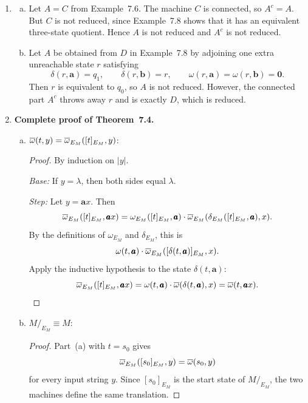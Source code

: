 \begin{enumerate}[{7.}1.]
\begin{enumerate}[(a)]
  \item The missing property is surjectivity of $\mu$ onto $S_2$.
\end{enumerate}

\item \begin{enumerate}[(a)]
  \item Let $A=C$ from Example~7.6.  The machine $C$ is connected, so $A^c=A$.
  But $C$ is not reduced, since Example~7.8 shows that it has an equivalent
  three-state quotient.  Hence $A$ is not reduced and $A^c$ is not reduced.

  \item Let $A$ be obtained from $D$ in Example~7.8 by adjoining one extra
  unreachable state $r$ satisfying
  \[
    \delta(r,\pmb{a})=q_1,\qquad \delta(r,\pmb{b})=r,\qquad
    \omega(r,\pmb{a})=\omega(r,\pmb{b})=\pmb{0}.
  \]
  Then $r$ is equivalent to $q_0$, so $A$ is not reduced.  However, the
  connected part $A^c$ throws away $r$ and is exactly $D$, which is reduced.
\end{enumerate}

\item \textbf{Complete proof of Theorem~7.4.}

\begin{enumerate}[(a)]
  \item $\overline{\omega}(t,y)=\overline{\omega}_{E_M}([t]_{E_M},y)$:

  \begin{proof}
  By induction on $|y|$.

  \emph{Base:} If $y=\lambda$, then both sides equal $\lambda$.

  \emph{Step:} Let $y=\pmb{a}x$.  Then
  \[
    \overline{\omega}_{E_M}([t]_{E_M},\pmb{a}x)
    =\omega_{E_M}([t]_{E_M},\pmb{a})\cdot
      \overline{\omega}_{E_M}(\delta_{E_M}([t]_{E_M},\pmb{a}),x).
  \]
  By the definitions of $\omega_{E_M}$ and $\delta_{E_M}$, this is
  \[
    \omega(t,\pmb{a})\cdot
      \overline{\omega}_{E_M}([\delta(t,\pmb{a})]_{E_M},x).
  \]
  Apply the inductive hypothesis to the state $\delta(t,\pmb{a})$:
  \[
    \overline{\omega}_{E_M}([t]_{E_M},\pmb{a}x)
    =\omega(t,\pmb{a})\cdot\overline{\omega}(\delta(t,\pmb{a}),x)
    =\overline{\omega}(t,\pmb{a}x).
  \]
  \end{proof}

  \item $M/_{E_M}\equiv M$:

  \begin{proof}
  Part~(a) with $t=s_0$ gives
  \[
    \overline{\omega}_{E_M}([s_0]_{E_M},y)=\overline{\omega}(s_0,y)
  \]
  for every input string $y$.  Since $[s_0]_{E_M}$ is the start state of
  $M/_{E_M}$, the two machines define the same translation.
  \end{proof}


\end{enumerate}
\end{enumerate}
